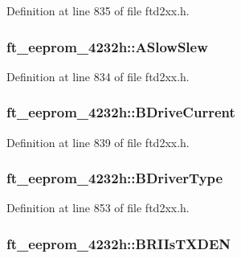 Definition at line 835 of file ftd2xx.h.\hypertarget{structft__eeprom__4232h_a1e66ea6b513734d830d86565441b6318}{
\subsubsection[{ASlowSlew}]{ {\bf ft\_\-eeprom\_\-4232h::ASlowSlew}}}
\label{structft__eeprom__4232h_a1e66ea6b513734d830d86565441b6318}


Definition at line 834 of file ftd2xx.h.\hypertarget{structft__eeprom__4232h_ac42c22b82bdca1458089ac49f0eaefa1}{
\subsubsection[{BDriveCurrent}]{ {\bf ft\_\-eeprom\_\-4232h::BDriveCurrent}}}
\label{structft__eeprom__4232h_ac42c22b82bdca1458089ac49f0eaefa1}


Definition at line 839 of file ftd2xx.h.\hypertarget{structft__eeprom__4232h_a6a5cbfcb0e59bd89ed6338f44f8c5b5c}{
\subsubsection[{BDriverType}]{ {\bf ft\_\-eeprom\_\-4232h::BDriverType}}}
\label{structft__eeprom__4232h_a6a5cbfcb0e59bd89ed6338f44f8c5b5c}


Definition at line 853 of file ftd2xx.h.\hypertarget{structft__eeprom__4232h_aa9e48949d47395e2a805d93d4affa572}{
\subsubsection[{BRIIsTXDEN}]{ {\bf ft\_\-eeprom\_\-4232h::BRIIsTXDEN}}}
\label{structft__eeprom__4232h_aa9e48949d47395e2a805d93d4affa572}



